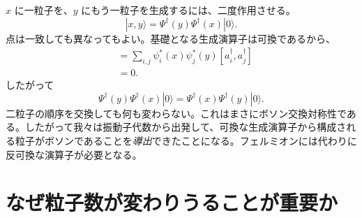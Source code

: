 \(x\) に一粒子を、\(y\) にもう一粒子を生成するには、二度作用させる。
\begin{equation}
|x,y\rangle
=\Psi^\dagger(y)\Psi^\dagger(x)|0\rangle.
\label{eq:l06-two-particle-state}
\end{equation}
点は一致しても異なってもよい。基礎となる生成演算子は可換であるから、
\begin{align}
[\Psi^\dagger(x),\Psi^\dagger(y)]
&=\sum_{i,j}\psi_i^*(x)\psi_j^*(y)
[a_i^\dagger,a_j^\dagger] \\
&=0.
\end{align}
したがって
\begin{equation}
\Psi^\dagger(y)\Psi^\dagger(x)|0\rangle
=\Psi^\dagger(x)\Psi^\dagger(y)|0\rangle.
\label{eq:l06-boson-exchange}
\end{equation}
二粒子の順序を交換しても何も変わらない。これはまさにボソン交換対称性である。したがって我々は振動子代数から出発して、可換な生成演算子から構成される粒子がボソンであることを\emph{導出}できたことになる。フェルミオンには代わりに反可換な演算子が必要となる。

\begin{classroomqa}
\end{classroomqa}

\begin{classroomqa}
\end{classroomqa}

\begin{classroomqa}
\end{classroomqa}

\section{なぜ粒子数が変わりうることが重要か}

